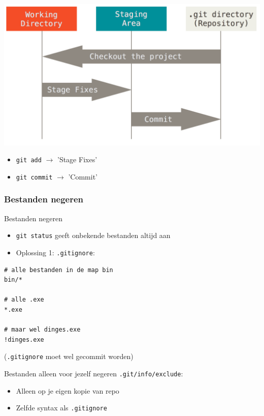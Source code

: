 \begin{frame}
	\begin{center}
		\includegraphics[width=\textwidth]{images/areas}
	\end{center}
	\begin{itemize}
		\item \texttt{git add} $\rightarrow$ 'Stage Fixes'
		\item \texttt{git commit} $\rightarrow$ 'Commit'
	\end{itemize}
\end{frame}

\subsubsection{Bestanden negeren}
\begin{frame}[fragile]{Bestanden negeren}
	\begin{itemize}
		\item \texttt{git status} geeft onbekende bestanden altijd aan
		\item Oplossing 1: \texttt{.gitignore}:
	\end{itemize}
	\begin{verbatim}
# alle bestanden in de map bin
bin/*

# alle .exe
*.exe

# maar wel dinges.exe
!dinges.exe
	\end{verbatim}

	(\texttt{.gitignore} moet wel gecommit worden)
\end{frame}

\begin{frame}{Bestanden alleen voor jezelf negeren}
	\texttt{.git/info/exclude}:
	\begin{itemize}
		\item Alleen op je eigen kopie van repo
		\item Zelfde syntax als \texttt{.gitignore}
	\end{itemize}
\end{frame}

